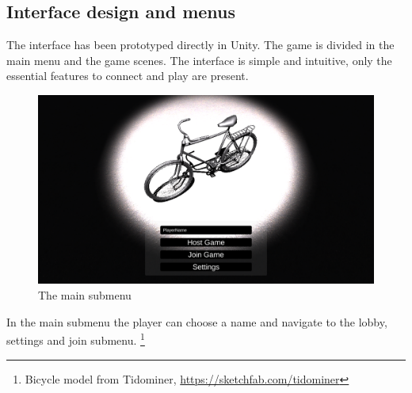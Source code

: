 \documentclass[12pt]{article}
\begin{document}
\clearpage

\subsection{Interface design and menus}
The interface has been prototyped directly in Unity. The game is divided in the main menu and the game scenes. The interface is simple and intuitive, only the essential features to connect and play are present. 
\begin{figure}[H]
\includegraphics[width=\textwidth]{splash}
\caption{The main submenu}
\end{figure}
In the main submenu the player can choose a name and navigate to the lobby, settings and join submenu. \footnote{Bicycle model from Tidominer, \url{https://sketchfab.com/tidominer}}
\end{document}
